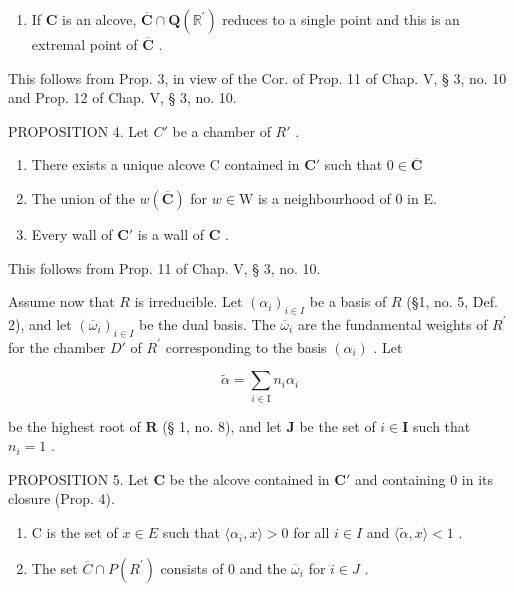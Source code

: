 \begin{enumerate}
\def\labelenumi{(\roman{enumi})}
\setcounter{enumi}{1}
\tightlist
\item
  If \(\mathbf{C}\) is an alcove, \(\overline{\mathbf{C}} \cap \mathbf{Q}(\mathbb{R}^{\prime})\) reduces to a single point and this is an extremal point of \(\overline{\mathbf{C}}\) .
\end{enumerate}

This follows from Prop. 3, in view of the Cor. of Prop. 11 of Chap. V, § 3, no. 10 and Prop. 12 of Chap. V, § 3, no. 10.

PROPOSITION 4. Let \(C'\) be a chamber of \(R'\) .

\begin{enumerate}
\def\labelenumi{(\roman{enumi})}
\item
  There exists a unique alcove C contained in \(\mathbf{C}'\) such that \(0\in \overline{\mathbf{C}}\)
\item
  The union of the \(w(\overline{\mathbf{C}})\) for \(w\in \mathrm{W}\) is a neighbourhood of 0 in E.
\item
  Every wall of \(\mathbf{C}'\) is a wall of \(\mathbf{C}\) .
\end{enumerate}

This follows from Prop. 11 of Chap. V, § 3, no. 10.

Assume now that \(R\) is irreducible. Let \((\alpha_i)_{i\in I}\) be a basis of \(R\) (§1, no. 5, Def. 2), and let \((\overline{\omega}_i)_{i\in I}\) be the dual basis. The \(\overline{\omega}_i\) are the fundamental weights of \(R^{\prime}\) for the chamber \(D'\) of \(R^{\prime}\) corresponding to the basis \((\alpha_i)\) . Let

\[
\tilde {\alpha} = \sum_ {i \in \mathrm{I}} n _ {i} \alpha_ {i}
\]

be the highest root of \(\mathbf{R}\) (§ 1, no. 8), and let \(\mathbf{J}\) be the set of \(i \in \mathbf{I}\) such that \(n_i = 1\) .

PROPOSITION 5. Let \(\mathbf{C}\) be the alcove contained in \(\mathbf{C}'\) and containing 0 in its closure (Prop. 4).

\begin{enumerate}
\def\labelenumi{(\roman{enumi})}
\tightlist
\item
  C is the set of \(x \in E\) such that \(\langle\alpha_{i}, x\rangle > 0\) for all \(i \in I\) and \(\langle\tilde{\alpha}, x\rangle < 1\) .
\item
  The set \(\overline{C} \cap P(R^{\prime})\) consists of 0 and the \(\overline{\omega}_{i}\) for \(i \in J\) .
\end{enumerate}


